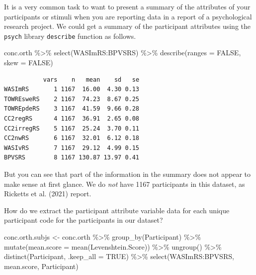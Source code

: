 \documentclass[
  letterpaper,
  DIV=11,
  numbers=noendperiod]{scrreprt}
\newenvironment{Shaded}{\begin{snugshade}}{\end{snugshade}}
\newcommand{\AttributeTok}[1]{\textcolor[rgb]{0.40,0.45,0.13}{#1}}
\newcommand{\ConstantTok}[1]{\textcolor[rgb]{0.56,0.35,0.01}{#1}}
\newcommand{\FunctionTok}[1]{\textcolor[rgb]{0.28,0.35,0.67}{#1}}
\newcommand{\NormalTok}[1]{\textcolor[rgb]{0.00,0.23,0.31}{#1}}
\newcommand{\OtherTok}[1]{\textcolor[rgb]{0.00,0.23,0.31}{#1}}
\newcommand{\SpecialCharTok}[1]{\textcolor[rgb]{0.37,0.37,0.37}{#1}}
\begin{document}
It is a very common task to want to present a summary of the attributes
of your participants or stimuli when you are reporting data in a report
of a psychological research project. We could get a summary of the
participant attributes using the \texttt{psych} library
\texttt{describe} function as follows.

\begin{Shaded}
\begin{Highlighting}[]
\NormalTok{conc.orth }\SpecialCharTok{\%\textgreater{}\%}
  \FunctionTok{select}\NormalTok{(WASImRS}\SpecialCharTok{:}\NormalTok{BPVSRS) }\SpecialCharTok{\%\textgreater{}\%}
  \FunctionTok{describe}\NormalTok{(}\AttributeTok{ranges =} \ConstantTok{FALSE}\NormalTok{, }\AttributeTok{skew =} \ConstantTok{FALSE}\NormalTok{)}
\end{Highlighting}
\end{Shaded}

\begin{verbatim}
           vars    n   mean    sd   se
WASImRS       1 1167  16.00  4.30 0.13
TOWREsweRS    2 1167  74.23  8.67 0.25
TOWREpdeRS    3 1167  41.59  9.66 0.28
CC2regRS      4 1167  36.91  2.65 0.08
CC2irregRS    5 1167  25.24  3.70 0.11
CC2nwRS       6 1167  32.01  6.12 0.18
WASIvRS       7 1167  29.12  4.99 0.15
BPVSRS        8 1167 130.87 13.97 0.41
\end{verbatim}

But you can see that part of the information in the summary does not
appear to make sense at first glance. We do \emph{not} have 1167
participants in this dataset, as Ricketts et al. (2021) report.

How do we extract the participant attribute variable data for each
unique participant code for the participants in our dataset?

\begin{Shaded}
\begin{Highlighting}[numbers=left,,]
\NormalTok{conc.orth.subjs }\OtherTok{\textless{}{-}}\NormalTok{ conc.orth }\SpecialCharTok{\%\textgreater{}\%}
  \FunctionTok{group\_by}\NormalTok{(Participant) }\SpecialCharTok{\%\textgreater{}\%}
  \FunctionTok{mutate}\NormalTok{(}\AttributeTok{mean.score =} \FunctionTok{mean}\NormalTok{(Levenshtein.Score)) }\SpecialCharTok{\%\textgreater{}\%}
  \FunctionTok{ungroup}\NormalTok{() }\SpecialCharTok{\%\textgreater{}\%}
  \FunctionTok{distinct}\NormalTok{(Participant, }\AttributeTok{.keep\_all =} \ConstantTok{TRUE}\NormalTok{) }\SpecialCharTok{\%\textgreater{}\%}
  \FunctionTok{select}\NormalTok{(WASImRS}\SpecialCharTok{:}\NormalTok{BPVSRS, mean.score, Participant)}
\end{Highlighting}
\end{Shaded}
\end{document}
